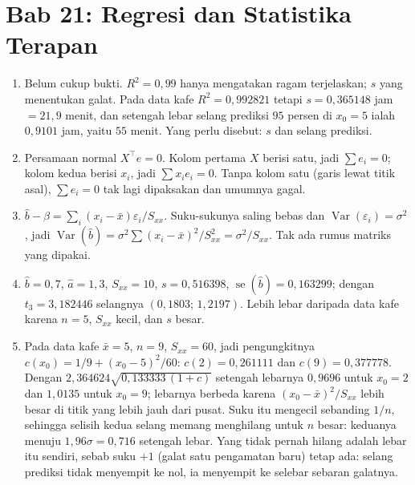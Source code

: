 \section*{Bab 21: Regresi dan Statistika Terapan}
\begin{enumerate}[label=\textbf{21.\arabic*}]
  \item Belum cukup bukti. $R^{2}=0{,}99$ hanya mengatakan ragam terjelaskan;
        $s$ yang menentukan galat. Pada data kafe $R^{2}=0{,}992821$ tetapi
        $s=0{,}365148$ jam $=21{,}9$ menit, dan setengah lebar selang prediksi $95$
        persen di $x_{0}=5$ ialah $0{,}9101$ jam, yaitu $55$ menit. Yang perlu
        disebut: $s$ dan selang prediksi.

  \item Persamaan normal $X^{\top}e=0$. Kolom pertama $X$ berisi satu, jadi
        $\sum e_{i}=0$; kolom kedua berisi $x_{i}$, jadi $\sum x_{i}e_{i}=0$.
        Tanpa kolom satu (garis lewat titik asal), $\sum e_{i}=0$ tak lagi dipaksakan
        dan umumnya gagal.

  \item $\hat b-\beta=\sum_{i}(x_{i}-\bar x)\varepsilon_{i}/S_{xx}$. Suku-sukunya
        saling bebas dan $\operatorname{Var}(\varepsilon_{i})=\sigma^{2}$, jadi
        $\operatorname{Var}(\hat b)=\sigma^{2}\sum(x_{i}-\bar x)^{2}/S_{xx}^{2}
        =\sigma^{2}/S_{xx}$. Tak ada rumus matriks yang dipakai.

  \item $\hat b=0{,}7$, $\hat a=1{,}3$, $S_{xx}=10$, $s=0{,}516398$,
        $\operatorname{se}(\hat b)=0{,}163299$; dengan $t_{3}=3{,}182446$ selangnya
        $(0{,}1803;\,1{,}2197)$. Lebih lebar daripada data kafe karena $n=5$,
        $S_{xx}$ kecil, dan $s$ besar.

  \item 
Pada data kafe $\bar x=5$, $n=9$, $S_{xx}=60$, jadi pengungkitnya
$c(x_{0})=1/9+(x_{0}-5)^{2}/60$: $c(2)=0{,}261111$ dan $c(9)=0{,}377778$.
Dengan $2{,}364624\sqrt{0{,}133333\,(1+c)}$ setengah lebarnya $0{,}9696$ untuk
$x_{0}=2$ dan $1{,}0135$ untuk $x_{0}=9$; lebarnya berbeda karena
$(x_{0}-\bar x)^{2}/S_{xx}$ lebih besar di titik yang lebih jauh dari pusat.
Suku itu mengecil sebanding $1/n$, sehingga selisih kedua selang memang
menghilang untuk $n$ besar: keduanya menuju $1{,}96\sigma=0{,}716$ setengah
lebar. Yang tidak pernah hilang adalah lebar itu sendiri, sebab suku $+1$
(galat satu pengamatan baru) tetap ada: selang prediksi tidak menyempit ke
nol, ia menyempit ke selebar sebaran galatnya.


\end{enumerate}
